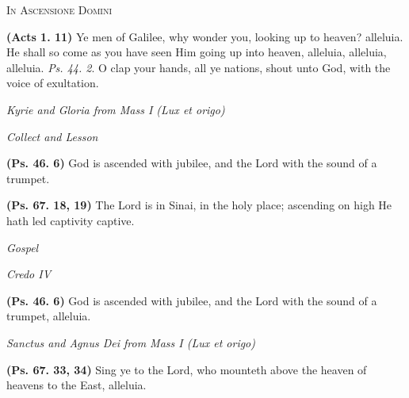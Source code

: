 \documentclass[11pt]{article} %
\begin{document}
\begin{center}\begin{huge}
  \textsc{In Ascensione Domini}
\end{huge}\end{center}

\def\greinitialformat#1{%
  {\fontsize{34}{34}\selectfont #1}%
}

\textbf{(Acts 1. 11)} Ye men of Galilee, why wonder you, looking up to heaven? alleluia.  He shall so come as you have seen Him going up into heaven, alleluia, alleluia, alleluia. \emph{Ps. 44. 2}. O clap your hands, all ye nations, shout unto God, with the voice of exultation.

\vskip10pt

\emph{Kyrie and Gloria from Mass I (Lux et origo)}

\emph{Collect and Lesson}

\vskip10pt

\textbf{(Ps. 46. 6)} God is ascended with jubilee, and the Lord with the sound of a trumpet.

\vskip10pt

\textbf{(Ps. 67. 18, 19)} The Lord is in Sinai, in the holy place; ascending on high He hath led captivity captive.

\vskip10pt

\emph{Gospel}

\emph{Credo IV}

\vskip20pt


\textbf{(Ps. 46. 6)} God is ascended with jubilee, and the Lord with the sound of a trumpet, alleluia.

\vskip10pt

\emph{Sanctus and Agnus Dei from Mass I (Lux et origo)}

\vskip20pt


\textbf{(Ps. 67. 33, 34)} Sing ye to the Lord, who mounteth above the heaven of heavens to the East, alleluia.
\end{document}
